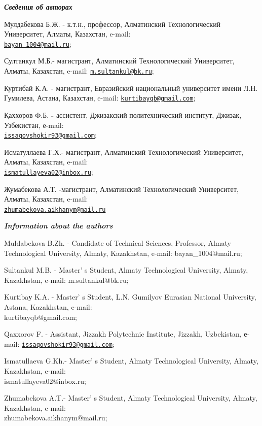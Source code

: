 \begin{authorinfo}
\emph{{\bfseries Сведения об авторах}}

Мулдабекова Б.Ж. - к.т.н., профессор, Алматинский Технологический
Университет, Алматы, Казахстан, e-mail:\\
\href{mailto:bayan_1004@mail.ru}{\nolinkurl{bayan\_1004@mail.ru}};

Султанкул М.Б.- магистрант, Алматинский Технологический Университет,
Алматы, Казахстан, e-mail:
\href{mailto:m.sultankul@bk.ru}{\nolinkurl{m.sultankul@bk.ru}};

Куртибай К.А. - магистрант, Евразийский национальный университет имени
Л.Н. Гумилева, Астана, Казахстан, e-mail:
\href{mailto:kurtibayqb@gmail.com}{\nolinkurl{kurtibayqb@gmail.com}};

Қаххоров Ф.Б. {\bfseries -} ассистент, Джизакский политехнический институт,
Джизак, Узбекистан, е-mail:\\
\href{mailto:issaqovshokir93@gmail.com}{\nolinkurl{issaqovshokir93@gmail.com}};

Исматуллаева Г.Х.- магистрант, Алматинский Технологический Университет,
Алматы, Казахстан, e-mail:\\
\href{mailto:ismatullayeva02@inbox.ru}{\nolinkurl{ismatullayeva02@inbox.ru}};

Жумабекова А.Т. -магистрант, Алматинский Технологический Университет,
Алматы, Казахстан, e-mail:\\
\href{mailto:zhumabekova.aikhanym@mail.ru}{\nolinkurl{zhumabekova.aikhanym@mail.ru}}

\emph{{\bfseries Information about the authors}}

Muldabekova B.Zh. - Candidate of Technical Sciences, Professor, Almaty
Technological University, Almaty, Kazakhstan, e-mail:
bayan\_1004@mail.ru;

Sultankul M.B. - Master' s Student, Almaty Technological
University, Almaty, Kazakhstan, e-mail: m.sultankul@bk.ru;

Kurtibaу K.A. - Master' s Student, L.N. Gumilyov Eurasian
National University, Astana, Kazakhstan, e-mail: \\kurtibayqb@gmail.com;

Qaxxorov F. - Assistant, Jizzakh Polytechnic Institute, Jizzakh,
Uzbekistan, е-mail:
\href{mailto:issaqovshokir93@gmail.com}{\nolinkurl{issaqovshokir93@gmail.com}};

Ismatullaeva G.Kh.- Master' s Student, Almaty
Technological University, Almaty, Kazakhstan, e-mail:\\
ismatullayeva02@inbox.ru;

Zhumabekova A.T.- Master' s Student, Almaty Technological
University, Almaty, Kazakhstan, e-mail: \\zhumabekova.aikhanym@mail.ru;
\end{authorinfo}

